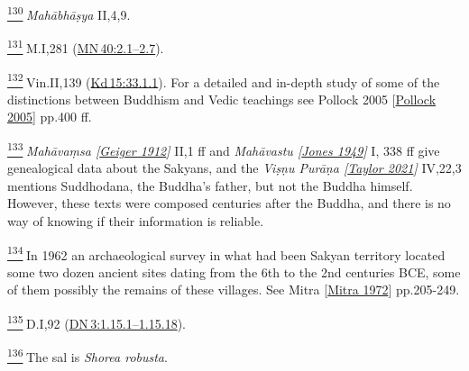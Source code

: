 \label{footprints_split_024.html_fn130}
\hyperref[footprints_split_007.htmlux5cux23fnref130]{\textsuperscript{130}} \emph{Mahābhāṣya}
II,4,9.

\label{footprints_split_024.html_fn131}
\hyperref[footprints_split_007.htmlux5cux23fnref131]{\textsuperscript{131}} M.I,281
(\href{https://suttacentral.net/mn40/en/sujato\#2.1}{MN\,40:2.1--2.7}).

\label{footprints_split_024.html_fn132}
\hyperref[footprints_split_007.htmlux5cux23fnref132]{\textsuperscript{132}} Vin.II,139
(\href{https://suttacentral.net/pli-tv-kd15/en/brahmali\#33.1.1}{Kd\,15:33.1.1}).
For a detailed and in-depth study of some of the distinctions between
Buddhism and Vedic teachings see {Pollock 2005
{{[}\hyperref[footprints_split_022.htmlux5cux23Pollockux5cux25202005]{Pollock
2005}{]}}} pp.400 ff.

\label{footprints_split_024.html_fn133}
\hyperref[footprints_split_008.htmlux5cux23fnref133]{\textsuperscript{133}} \emph{{Mahāvaṃsa
{{[}\hyperref[footprints_split_023.htmlux5cux23Geigerux5cux25201912]{Geiger
1912}{]}}}} II,1 ff and \emph{{Mahāvastu
{{[}\hyperref[footprints_split_023.htmlux5cux23Jonesux5cux25201949]{Jones
1949}{]}}}} I, 338 ff give genealogical data about the Sakyans, and the
\emph{{Viṣṇu Purāṇa
{{[}\hyperref[footprints_split_023.htmlux5cux23Taylorux5cux25202021]{Taylor
2021}{]}}}} IV,22,3 mentions Suddhodana, the Buddha's father, but not
the Buddha himself. However, these texts were composed centuries after
the Buddha, and there is no way of knowing if their information is
reliable.

\label{footprints_split_024.html_fn134}
\hyperref[footprints_split_008.htmlux5cux23fnref134]{\textsuperscript{134}} In
1962 an archaeological survey in what had been Sakyan territory located
some two dozen ancient sites dating from the 6{th} to the 2{nd}
centuries BCE, some of them possibly the remains of these villages. See
{Mitra
{{[}\hyperref[footprints_split_022.htmlux5cux23Mitraux5cux25201972]{Mitra
1972}{]}}} pp.205-249.

\label{footprints_split_024.html_fn135}
\hyperref[footprints_split_008.htmlux5cux23fnref135]{\textsuperscript{135}} D.I,92
(\href{https://suttacentral.net/dn3/en/sujato\#1.15.1}{DN\,3:1.15.1--1.15.18}).

\label{footprints_split_024.html_fn136}
\hyperref[footprints_split_008.htmlux5cux23fnref136]{\textsuperscript{136}} The
sal is \emph{Shorea robusta}.

